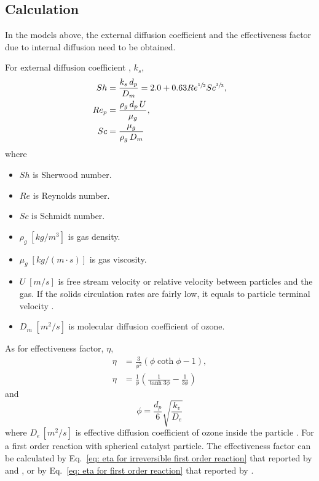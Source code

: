 \subsection{Calculation}
In the models above, the external diffusion coefficient and the effectiveness factor due to internal diffusion need to be obtained.

For external diffusion coefficient \citep[pg. 691]{fogler2016element}, $k_s$, 
\begin{align}
    Sh &= \frac{k_s\, d_p}{D_m} 
        = 2.0 + 0.63 Re^{\sfrac{1}{2}}Sc^{\sfrac{1}{3}},
    \\
    Re_p &= \frac{\rho_g\, d_p\, U}{\mu_g},
    \\
    Sc &= \frac{\mu_g}{\rho_g\,D_m}
\end{align}
where 
\begin{itemize}
    \item $Sh$ is Sherwood number. 
    \item $Re$ is Reynolds number. 
    \item $Sc$ is Schmidt number. 
    \item $\rho_g \; [\si{kg/m^3}]$ is gas density. 
    \item $\mu_g \; \si{[kg/(m\cdot s)]}$ is gas viscosity. 
    \item $U\;[\si{m/s}]$ is free stream velocity or relative velocity between particles and the gas. 
    If the solids circulation rates are fairly low, it equals to particle terminal velocity \citep{jiang1991baffle}. 
    \item $D_m\;[\si{m^2/s}]$ is molecular diffusion coefficient of ozone.  
\end{itemize}

As for effectiveness factor, $\eta$, 
\begin{align}
    \eta &= \frac{3}{\phi^2}(\phi \coth{\phi}-1),
    \label{eq: eta for first order reaction} \\
    \eta &= \frac{1}{\phi}\left(
        \frac{1}{\tanh{3\phi}} - \frac{1}{3 \phi}    
    \right)
    \label{eq: eta for irreversible first order reaction}
\end{align}
and
\begin{equation*}
    \phi = \frac{d_p}{6}\sqrt{\frac{k_v}{D_e}}
\end{equation*}
where $D_e\,[\si{m^2/s}]$ is effective diffusion coefficient of ozone inside the particle \citep[pg. 721]{fogler2016element}. 
For a first order reaction with spherical catalyst particle. 
The effectiveness factor can be calculated by Eq.~\eqref{eq: eta for irreversible first order reaction} that reported by \citet{li2017reaction} and \citet{jiang1991baffle}, or by Eq.~\eqref{eq: eta for first order reaction} that reported by \citet{fogler2016element}.

